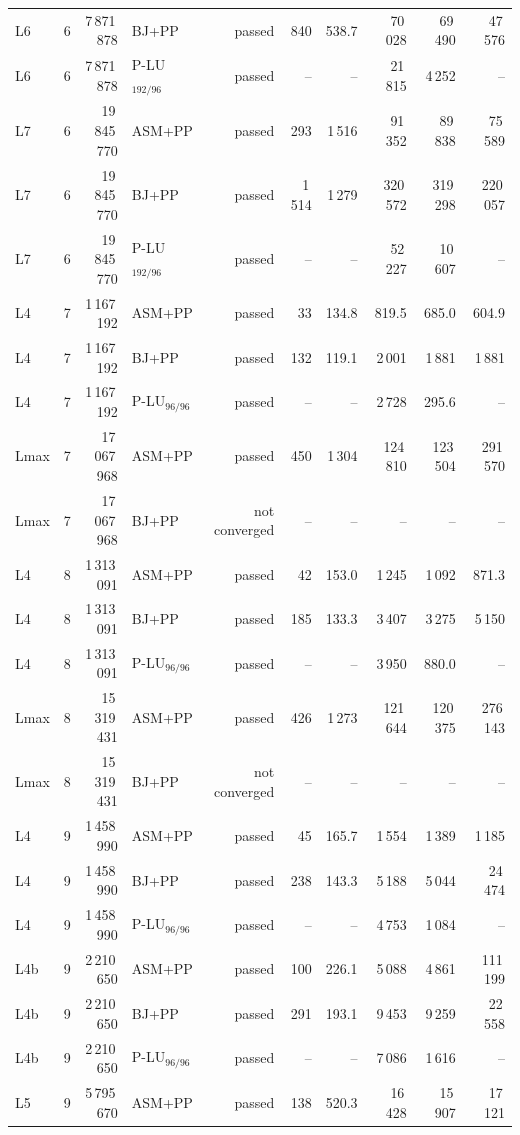 \begin{tabular}{lrrlrrrrrr}
L6 & 6 & 7\,871\,878 & BJ+PP & passed & 840 & 538.7 & 70\,028 & 69\,490 & 47\,576\\
L6 & 6 & 7\,871\,878 & P-LU$_{192/96}$ & passed & -- & -- & 21\,815 & 4\,252 & --\\
L7 & 6 & 19\,845\,770 & ASM+PP & passed & 293 & 1\,516 & 91\,352 & 89\,838 & 75\,589\\
L7 & 6 & 19\,845\,770 & BJ+PP & passed & 1\,514 & 1\,279 & 320\,572 & 319\,298 & 220\,057\\
L7 & 6 & 19\,845\,770 & P-LU$_{192/96}$ & passed & -- & -- & 52\,227 & 10\,607 & --\\
L4 & 7 & 1\,167\,192 & ASM+PP & passed & 33 & 134.8 & 819.5 & 685.0 & 604.9\\
L4 & 7 & 1\,167\,192 & BJ+PP & passed & 132 & 119.1 & 2\,001 & 1\,881 & 1\,881\\
L4 & 7 & 1\,167\,192 & P-LU$_{96/96}$ & passed & -- & -- & 2\,728 & 295.6 & --\\
Lmax & 7 & 17\,067\,968 & ASM+PP & passed & 450 & 1\,304 & 124\,810 & 123\,504 & 291\,570\\
Lmax & 7 & 17\,067\,968 & BJ+PP & not converged & -- & -- & -- & -- & --\\
L4 & 8 & 1\,313\,091 & ASM+PP & passed & 42 & 153.0 & 1\,245 & 1\,092 & 871.3\\
L4 & 8 & 1\,313\,091 & BJ+PP & passed & 185 & 133.3 & 3\,407 & 3\,275 & 5\,150\\
L4 & 8 & 1\,313\,091 & P-LU$_{96/96}$ & passed & -- & -- & 3\,950 & 880.0 & --\\
Lmax & 8 & 15\,319\,431 & ASM+PP & passed & 426 & 1\,273 & 121\,644 & 120\,375 & 276\,143\\
Lmax & 8 & 15\,319\,431 & BJ+PP & not converged & -- & -- & -- & -- & --\\
L4 & 9 & 1\,458\,990 & ASM+PP & passed & 45 & 165.7 & 1\,554 & 1\,389 & 1\,185\\
L4 & 9 & 1\,458\,990 & BJ+PP & passed & 238 & 143.3 & 5\,188 & 5\,044 & 24\,474\\
L4 & 9 & 1\,458\,990 & P-LU$_{96/96}$ & passed & -- & -- & 4\,753 & 1\,084 & --\\
L4b & 9 & 2\,210\,650 & ASM+PP & passed & 100 & 226.1 & 5\,088 & 4\,861 & 111\,199\\
L4b & 9 & 2\,210\,650 & BJ+PP & passed & 291 & 193.1 & 9\,453 & 9\,259 & 22\,558\\
L4b & 9 & 2\,210\,650 & P-LU$_{96/96}$ & passed & -- & -- & 7\,086 & 1\,616 & --\\
L5 & 9 & 5\,795\,670 & ASM+PP & passed & 138 & 520.3 & 16\,428 & 15\,907 & 17\,121\\

\end{tabular}
